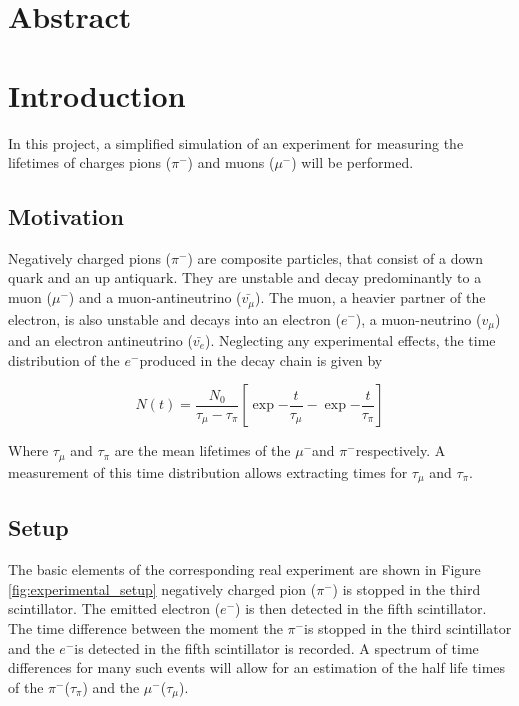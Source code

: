 \documentclass[11pt, a4paper, oneside]{book}
\newcommand{\electron}{$e^{-}$}
\newcommand{\pion}{$\pi^{-}$}
\newcommand{\muon}{$\mu^{-}$}
\begin{document}

\frontmatter

\tableofcontents
\mainmatter

\chapter{Abstract}

\chapter{Introduction}
In this project, a simplified simulation of an experiment for measuring the lifetimes of charges pions (\pion) and muons (\muon) will be performed.

\section{Motivation}
Negatively charged pions (\pion) are composite particles, that consist of a down quark and an up antiquark. They are unstable and decay predominantly to a muon (\muon) and a muon-antineutrino ($\bar{v_{\mu}}$). The muon, a heavier partner of the electron, is also unstable and decays into an electron (\electron), a muon-neutrino ($v_{\mu}$) and an electron antineutrino ($\bar{v_{e}}$). Neglecting any experimental effects, the time distribution of the \electron produced in the decay chain is given by

\begin{equation}
    N(t) = \frac{N_0}{\tau_{\mu} - \tau_{\pi}}  \left[ \exp{-\frac{t}{\tau_{\mu}}} - \exp{-\frac{t}{\tau_{\pi}}} \right]
    \label{eq:decay_chain_equation}
\end{equation}

Where $\tau_{\mu}$ and $\tau_{\pi}$ are the mean lifetimes of the \muon and \pion respectively. A measurement of this time distribution allows extracting times for $\tau_{\mu}$ and $\tau_{\pi}$.

\section{Setup}

The basic elements of the corresponding real experiment are shown in Figure \ref{fig:experimental_setup} negatively charged pion (\pion) is stopped in the third scintillator. The emitted electron (\electron) is then detected in the fifth scintillator. The time difference between the moment the \pion is stopped in the third scintillator and the \electron is detected in the fifth scintillator is recorded. A spectrum of time differences for many such events will allow for an estimation of the half life times of the \pion ($\tau_{\pi}$) and the \muon ($\tau_{\mu}$).
\end{document}
